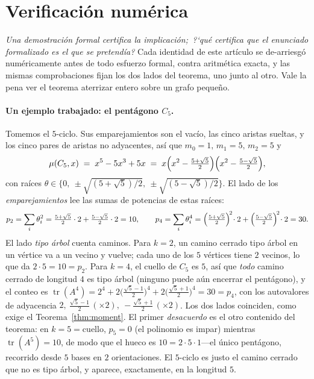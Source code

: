 \documentclass[11pt]{article}
\DeclareMathOperator{\tr}{tr}
\begin{document}
\section{Verificaci\'on num\'erica}
\label{sec:numeric}

\emph{Una demostraci\'on formal certifica la implicaci\'on; \,?`qu\'e certifica que el enunciado
formalizado es el que se pretend\'ia?} Cada identidad de este art\'iculo se de-arriesg\'o
num\'ericamente antes de todo esfuerzo formal, contra aritm\'etica exacta, y las mismas comprobaciones
fijan los dos lados del teorema, uno junto al otro. Vale la pena ver el teorema aterrizar entero sobre
un grafo peque\~no.

\paragraph{Un ejemplo trabajado: el pent\'agono $C_5$.} Tomemos el $5$-ciclo. Sus emparejamientos son
el vac\'io, las cinco aristas sueltas, y los cinco pares de aristas no adyacentes, as\'i que
$m_0=1,\,m_1=5,\,m_2=5$ y
\[
  \mu(C_5,x)\;=\;x^5-5x^3+5x\;=\;x\Bigl(x^2-\tfrac{5+\sqrt5}{2}\Bigr)\Bigl(x^2-\tfrac{5-\sqrt5}{2}\Bigr),
\]
con ra\'ices $\theta\in\bigl\{0,\ \pm\sqrt{(5+\sqrt5)/2},\ \pm\sqrt{(5-\sqrt5)/2}\bigr\}$. El lado de
los \emph{emparejamientos} lee las sumas de potencias de estas ra\'ices:
\[
  p_2=\sum_i\theta_i^2=\tfrac{5+\sqrt5}{2}\cdot2+\tfrac{5-\sqrt5}{2}\cdot2=10,
  \qquad
  p_4=\sum_i\theta_i^4=\Bigl(\tfrac{5+\sqrt5}{2}\Bigr)^{\!2}\!\cdot2+\Bigl(\tfrac{5-\sqrt5}{2}\Bigr)^{\!2}\!\cdot2=30.
\]
El lado \emph{tipo \'arbol} cuenta caminos. Para $k=2$, un camino cerrado tipo \'arbol en un v\'ertice
va a un vecino y vuelve; cada uno de los $5$ v\'ertices tiene $2$ vecinos, lo que da $2\cdot5=10=p_2$.
Para $k=4$, el cuello de $C_5$ es $5$, as\'i que \emph{todo} camino cerrado de longitud $4$ es tipo
\'arbol (ninguno puede a\'un encerrar el pent\'agono), y el conteo es
$\tr(A^4)=2^4+2\bigl(\tfrac{\sqrt5-1}{2}\bigr)^4+2\bigl(\tfrac{\sqrt5+1}{2}\bigr)^4=30=p_4$, con los
autovalores de adyacencia $2,\ \tfrac{\sqrt5-1}{2}\,(\times2),\ -\tfrac{\sqrt5+1}{2}\,(\times2)$. Los
dos lados coinciden, como exige el Teorema~\ref{thm:moment}. El primer \emph{desacuerdo} es el otro
contenido del teorema: en $k=5=\mathrm{cuello}$, $p_5=0$ (el polinomio es impar) mientras $\tr(A^5)=10$,
de modo que el hueco es $10=2\cdot5\cdot1$---el \'unico pent\'agono, recorrido desde $5$ bases en $2$
orientaciones. El $5$-ciclo es justo el camino cerrado que no es tipo \'arbol, y aparece, exactamente,
en la longitud $5$.
\end{document}
